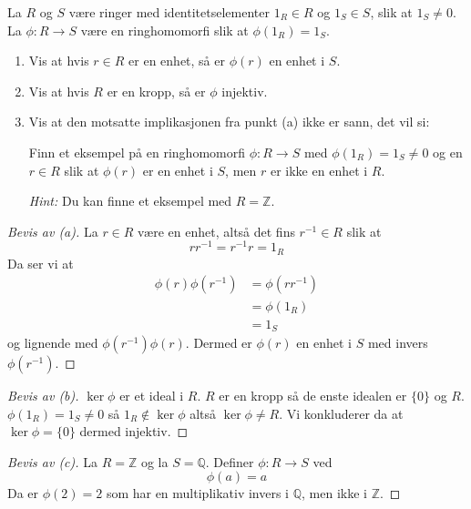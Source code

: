 \documentclass[11pt]{article}
\begin{document}
\newpage 
\begin{prob}[2]
    La $R$ og $S$ være ringer med identitetselementer $1_R \in R$ 
    og $1_S \in S$, slik at $1_S \neq 0$. La $\phi : R \to S$
    være en ringhomomorfi slik at $\phi(1_R) = 1_S$.

    \begin{enumerate}[label=(\alph*), align=left]
        \item Vis at hvis $r \in R$ er en enhet, så er 
            $\phi(r)$ en enhet i $S$.
        \item Vis at hvis $R$ er en kropp, så er $\phi$ injektiv. 
        \item Vis at den motsatte implikasjonen fra punkt (a) ikke 
            er sann, det vil si: 

            Finn et eksempel på en ringhomomorfi $\phi : R \to S$ 
            med $\phi(1_R) = 1_S \neq 0$ og en $r \in R$
            slik at $\phi(r)$ er en enhet i $S$, men $r$ er ikke
            en enhet i $R$.

            \emph{Hint:} Du kan finne et eksempel med $R = \mathbb Z$.
    \end{enumerate}
\end{prob}
\begin{proof}[Bevis av (a)]
    La $r \in R$ være en enhet, altså det fins 
    $r^{-1} \in R$ slik at 
    \[
        rr^{-1} = r^{-1}r = 1_R
    \]
    Da ser vi at 
    \begin{align*}
        \phi(r)\phi(r^{-1}) &= \phi(rr^{-1}) \\
                            &= \phi(1_R) \\ 
                            &= 1_S
    \end{align*}
    og lignende med $\phi(r^{-1})\phi(r)$.
    Dermed er $\phi(r)$ en enhet i $S$ med invers 
    $\phi(r^{-1})$.
\end{proof}
\begin{proof}[Bevis av (b)]
    $\ker \phi$ er et ideal i $R$. $R$ er en kropp så de enste 
    idealen er $\{0\}$ og $R$. $\phi(1_R) = 1_S \neq 0$ så 
    $1_R \not\in \ker \phi$ altså $\ker \phi \neq R$.
    Vi konkluderer da at $\ker \phi = \{0\}$ dermed injektiv.
\end{proof}
\begin{proof}[Bevis av (c)]
    La $R = \mathbb Z$ og la $S = \mathbb Q$. Definer $\phi : R \to S$ 
    ved 
    \[
        \phi(a) = a
    \]
    Da er $\phi(2) = 2$ som har en multiplikativ invers i $\mathbb Q$, 
    men ikke i $\mathbb Z$.
\end{proof}
\end{document}
